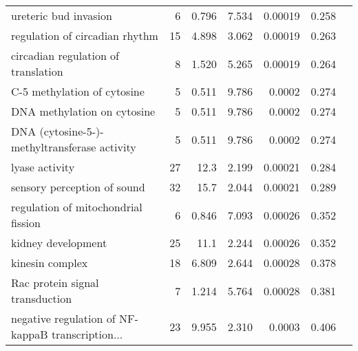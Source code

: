 \begin{longtable}{|l|r|r|r|r|r|}
                             ureteric bud invasion &                       6 &                   0.796 &      7.534 &              0.00019 &                        0.258~~ \\
                    regulation of circadian rhythm &                      15 &                   4.898 &      3.062 &              0.00019 &                        0.263~~ \\
               circadian regulation of translation &                       8 &                   1.520 &      5.265 &              0.00019 &                        0.264~~ \\
                       C-5 methylation of cytosine &                       5 &                   0.511 &      9.786 &               0.0002 &                        0.274~~ \\
                       DNA methylation on cytosine &                       5 &                   0.511 &      9.786 &               0.0002 &                        0.274~~ \\
      DNA (cytosine-5-)-methyltransferase activity &                       5 &                   0.511 &      9.786 &               0.0002 &                        0.274~~ \\
                                    lyase activity &                      27 &                    12.3 &      2.199 &              0.00021 &                        0.284~~ \\
                       sensory perception of sound &                      32 &                    15.7 &      2.044 &              0.00021 &                        0.289~~ \\
               regulation of mitochondrial fission &                       6 &                   0.846 &      7.093 &              0.00026 &                        0.352~~ \\
                                kidney development &                      25 &                    11.1 &      2.244 &              0.00026 &                        0.352~~ \\
                                   kinesin complex &                      18 &                   6.809 &      2.644 &              0.00028 &                        0.378~~ \\
                   Rac protein signal transduction &                       7 &                   1.214 &      5.764 &              0.00028 &                        0.381~~ \\
 negative regulation of NF-kappaB transcription... &                      23 &                   9.955 &      2.310 &               0.0003 &                        0.406~~ \\

\end{longtable}
